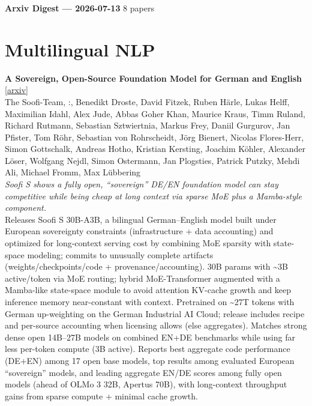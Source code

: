 \documentclass[12pt,letterpaper]{article}
\begin{document}
{\footnotesize\textbf{Arxiv Digest --- 2026-07-13} \hfill 8 papers}

\smallskip

\section*{Multilingual NLP}

{\small\textbf{A Sovereign, Open-Source Foundation Model for German and English}} {\scriptsize[\href{https://arxiv.org/abs/2607.09424}{arxiv}]}\\
{\scriptsize The Soofi-Team,  :, Benedikt Droste, David Fitzek, Ruben H\"arle, Lukas Helff, Maximilian Idahl, Alex Jude, Abbas Goher Khan, Maurice Kraus, Timm Ruland, Richard Rutmann, Sebastian Sztwiertnia, Markus Frey, Daniil Gurgurov, Jan Pfister, Tom R\"ohr, Sebastian von Rohrscheidt, J\"org Bienert, Nicolas Flores-Herr, Simon Gottschalk, Andreas Hotho, Kristian Kersting, Joachim K\"ohler, Alexander L\"oser, Wolfgang Nejdl, Simon Ostermann, Jan Plogsties, Patrick Putzky, Mehdi Ali, Michael Fromm, Max L\"ubbering}\\

{\small\textit{Soofi S shows a fully open, ``sovereign'' DE/EN foundation model can stay competitive while being cheap at long context via sparse MoE plus a Mamba-style component.}}\\[1pt]
{\footnotesize Releases Soofi S 30B-A3B, a bilingual German--English model built under European sovereignty constraints (infrastructure + data accounting) and optimized for long-context serving cost by combining MoE sparsity with state-space modeling; commits to unusually complete artifacts (weights/checkpoints/code + provenance/accounting). 30B params with \textasciitilde{}3B active/token via MoE routing; hybrid MoE-Transformer augmented with a Mamba-like state-space module to avoid attention KV-cache growth and keep inference memory near-constant with context. Pretrained on \textasciitilde{}27T tokens with German up-weighting on the German Industrial AI Cloud; release includes recipe and per-source accounting when licensing allows (else aggregates). Matches strong dense open 14B--27B models on combined EN+DE benchmarks while using far less per-token compute (3B active). Reports best aggregate code performance (DE+EN) among 17 open base models, top results among evaluated European ``sovereign'' models, and leading aggregate EN/DE scores among fully open models (ahead of OLMo 3 32B, Apertus 70B), with long-context throughput gains from sparse compute + minimal cache growth.}
\end{document}
